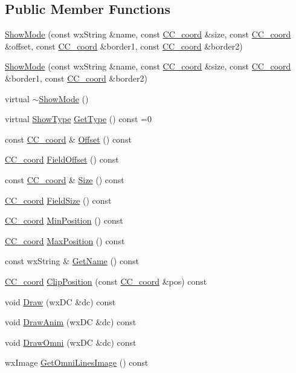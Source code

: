 \subsection*{Public Member Functions}
\begin{DoxyCompactItemize}
\item 
\hyperlink{a00140_a3949b5d7d786614b374c7dd7dfa5efdb}{Show\-Mode} (const wx\-String \&name, const \hyperlink{a00029}{C\-C\-\_\-coord} \&size, const \hyperlink{a00029}{C\-C\-\_\-coord} \&offset, const \hyperlink{a00029}{C\-C\-\_\-coord} \&border1, const \hyperlink{a00029}{C\-C\-\_\-coord} \&border2)
\item 
\hyperlink{a00140_affdb5fa321aef947a45f6848deeea238}{Show\-Mode} (const wx\-String \&name, const \hyperlink{a00029}{C\-C\-\_\-coord} \&size, const \hyperlink{a00029}{C\-C\-\_\-coord} \&border1, const \hyperlink{a00029}{C\-C\-\_\-coord} \&border2)
\item 
virtual \hyperlink{a00140_a4c8659e438d0f8b962a719aa9c5423d4}{$\sim$\-Show\-Mode} ()
\item 
virtual \hyperlink{a00140_a03678eaf2ac733b19b863d9fef35077c}{Show\-Type} \hyperlink{a00140_ae69502916ad62d71c9ad7d83f9092763}{Get\-Type} () const =0
\item 
const \hyperlink{a00029}{C\-C\-\_\-coord} \& \hyperlink{a00140_a3841f89ee808d98ce0bb53d27aff3b9c}{Offset} () const 
\item 
\hyperlink{a00029}{C\-C\-\_\-coord} \hyperlink{a00140_a70beb0936d3fe050ac44d20786972e84}{Field\-Offset} () const 
\item 
const \hyperlink{a00029}{C\-C\-\_\-coord} \& \hyperlink{a00140_aeef04345b0ea39667b06a6f382956a2a}{Size} () const 
\item 
\hyperlink{a00029}{C\-C\-\_\-coord} \hyperlink{a00140_a499f0e077629ab61318bdfb8e6491b34}{Field\-Size} () const 
\item 
\hyperlink{a00029}{C\-C\-\_\-coord} \hyperlink{a00140_a5fd7f242bebc385828c5f708e233ee49}{Min\-Position} () const 
\item 
\hyperlink{a00029}{C\-C\-\_\-coord} \hyperlink{a00140_a17f7af2f01cbdef3f6b90a639eeeb034}{Max\-Position} () const 
\item 
const wx\-String \& \hyperlink{a00140_a8bad87ef59dad92ec1afeb4cbdb5e4af}{Get\-Name} () const 
\item 
\hyperlink{a00029}{C\-C\-\_\-coord} \hyperlink{a00140_a2c5c4d3569e21707aa9bf44d6b73d0c7}{Clip\-Position} (const \hyperlink{a00029}{C\-C\-\_\-coord} \&pos) const 
\item 
void \hyperlink{a00140_ac12c99278ec8948488ce312cf6b82840}{Draw} (wx\-D\-C \&dc) const 
\item 
void \hyperlink{a00140_a6b9d10f594244a41c2d91569738d711c}{Draw\-Anim} (wx\-D\-C \&dc) const 
\item 
void \hyperlink{a00140_af18f2fc64531fc7583e5f57140865e65}{Draw\-Omni} (wx\-D\-C \&dc) const 
\item 
wx\-Image \hyperlink{a00140_a01cafcbf145f1cb60aa50f14f78cc98c}{Get\-Omni\-Lines\-Image} () const 
\end{DoxyCompactItemize}

